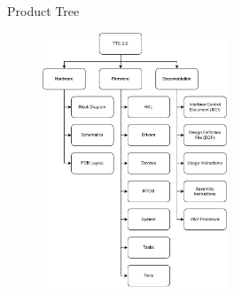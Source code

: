 \begin{frame}{Product Tree}

    \begin{figure}[!ht]
        \begin{center}
            \includegraphics[width=5.5cm]{figures/product-tree-bw}
        \end{center}
    \end{figure}

\end{frame}
